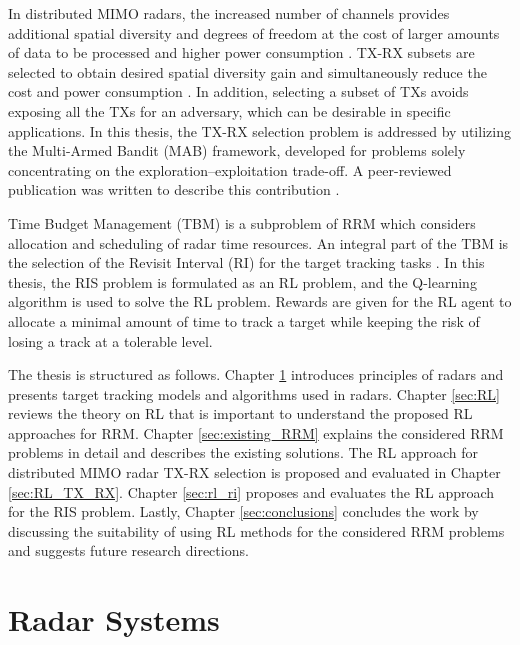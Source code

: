 \documentclass[english, 12pt, a4paper, elec, utf8, a-1b, online]{aaltothesis}
\numberwithin{equation}{section}
\begin{document}
In distributed MIMO radars, the increased number of channels provides additional spatial diversity and degrees of freedom at the cost of larger amounts of data to be processed and higher power consumption \cite{Haimovich2008, Aittomäki2011}.
TX-RX subsets are selected to obtain desired spatial diversity gain and simultaneously reduce the cost and power consumption \cite{Godrich2011a, Godrich2011, Sun2014}.
In addition, selecting a subset of TXs avoids exposing all the TXs for an adversary, which can be desirable in specific applications.
In this thesis, the TX-RX selection problem is addressed by utilizing the Multi-Armed Bandit (MAB) framework, developed for problems solely concentrating on the exploration--exploitation trade-off. 
A peer-reviewed publication was written to describe this contribution \cite{Pulkkinen2020}.

Time Budget Management (TBM) is a subproblem of RRM which considers allocation and scheduling of radar time resources.
An integral part of the TBM is the selection of the Revisit Interval (RI) for the target tracking tasks \cite{Cohen1986, Gardner1988, Munu1992, ChengTing2007, Baek2010, Watson1993, Charlish2015, Keuk1975, Shin1995, Benoudnine2006}.
In this thesis, the RIS problem is formulated as an RL problem, and the Q-learning algorithm is used to solve the RL problem.
Rewards are given for the RL agent to allocate a minimal amount of time to track a target while keeping the risk of losing a track at a tolerable level.

The thesis is structured as follows. 
Chapter \ref{sec:background} introduces principles of radars and presents target tracking models and algorithms used in radars.
Chapter \ref{sec:RL} reviews the theory on RL that is important to understand the proposed RL approaches for RRM. 
Chapter \ref{sec:existing_RRM} explains the considered RRM problems in detail and describes the existing solutions.
The RL approach for distributed MIMO radar TX-RX selection is proposed and evaluated in Chapter \ref{sec:RL_TX_RX}. 
Chapter \ref{sec:rl_ri} proposes and evaluates the RL approach for the RIS problem.
Lastly, Chapter \ref{sec:conclusions} concludes the work by discussing the suitability of using RL methods for the considered RRM problems and suggests future research directions.

\clearpage
\section{Radar Systems}\label{sec:background}
\end{document}
